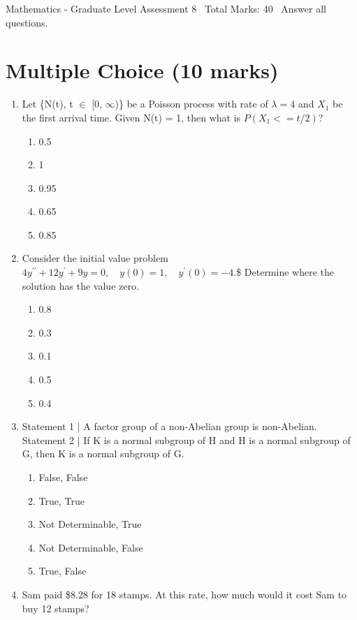 \documentclass[12pt]{article}
\begin{document}
\begin{center}
Mathematics - Graduate Level Assessment 8 \
Total Marks: 40 \
Answer all questions.
\end{center}

\section*{Multiple Choice (10 marks)}
\begin{enumerate}[label=\arabic*.]
\item Let \{N(t), t \ensuremath{\in} [0, \ensuremath{\infty})\} be a Poisson process with rate of $\lambda = 4$ and $X_1$ be the first arrival time. Given N(t) = 1, then what is $P(X_1 <= t / 2)$?
\begin{enumerate}[label=(\alph*)]
    \item 0.5
    \item 1
    \item 0.95
    \item 0.65
    \item 0.85
\end{enumerate}
\item Consider the initial value problem $ 4 y^{\prime \prime}+12 y^{\prime}+9 y=0, \quad y(0)=1, \quad y^{\prime}(0)=-4 . $\$ Determine where the solution has the value zero.
\begin{enumerate}[label=(\alph*)]
    \item 0.8
    \item 0.3
    \item 0.1
    \item 0.5
    \item 0.4
\end{enumerate}
\item Statement 1 | A factor group of a non-Abelian group is non-Abelian. Statement 2 | If K is a normal subgroup of H and H is a normal subgroup of G, then K is a normal subgroup of G.
\begin{enumerate}[label=(\alph*)]
    \item False, False
    \item True, True
    \item Not Determinable, True
    \item Not Determinable, False
    \item True, False
\end{enumerate}
\item Sam paid \$8.28 for 18 stamps. At this rate, how much would it cost Sam to buy 12 stamps?
\begin{enumerate}[label=(\alph*)]

\end{enumerate}
\end{enumerate}
\end{document}
